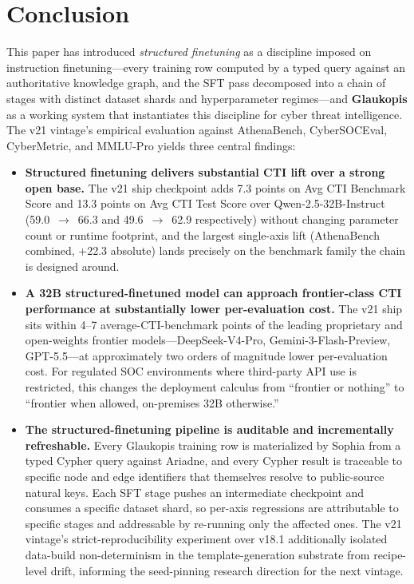 \documentclass[unnumsec,webpdf,contemporary,large]{oup-authoring-template}
\theoremstyle{thmstyleone}
\theoremstyle{thmstyletwo}
\theoremstyle{thmstylethree}
\begin{document}
\section{Conclusion}

This paper has introduced \textit{structured finetuning} as a discipline imposed on instruction finetuning---every training row computed by a typed query against an authoritative knowledge graph, and the SFT pass decomposed into a chain of stages with distinct dataset shards and hyperparameter regimes---and \textbf{Glaukopis} as a working system that instantiates this discipline for cyber threat intelligence. The v21 vintage's empirical evaluation against AthenaBench, CyberSOCEval, CyberMetric, and MMLU-Pro yields three central findings:

\begin{itemize}
  \item \textbf{Structured finetuning delivers substantial CTI lift over a strong open base.} The v21 ship checkpoint adds 7.3 points on Avg CTI Benchmark Score and 13.3 points on Avg CTI Test Score over Qwen-2.5-32B-Instruct (59.0~$\to$~66.3 and 49.6~$\to$~62.9 respectively) without changing parameter count or runtime footprint, and the largest single-axis lift (AthenaBench combined, +22.3 absolute) lands precisely on the benchmark family the chain is designed around.
  \item \textbf{A 32B structured-finetuned model can approach frontier-class CTI performance at substantially lower per-evaluation cost.} The v21 ship sits within 4--7 average-CTI-benchmark points of the leading proprietary and open-weights frontier models---DeepSeek-V4-Pro, Gemini-3-Flash-Preview, GPT-5.5---at approximately two orders of magnitude lower per-evaluation cost. For regulated SOC environments where third-party API use is restricted, this changes the deployment calculus from ``frontier or nothing'' to ``frontier when allowed, on-premises 32B otherwise.''
  \item \textbf{The structured-finetuning pipeline is auditable and incrementally refreshable.} Every Glaukopis training row is materialized by Sophia from a typed Cypher query against Ariadne, and every Cypher result is traceable to specific node and edge identifiers that themselves resolve to public-source natural keys. Each SFT stage pushes an intermediate checkpoint and consumes a specific dataset shard, so per-axis regressions are attributable to specific stages and addressable by re-running only the affected ones. The v21 vintage's strict-reproducibility experiment over v18.1 additionally isolated data-build non-determinism in the template-generation substrate from recipe-level drift, informing the seed-pinning research direction for the next vintage.
\end{itemize}
\end{document}

